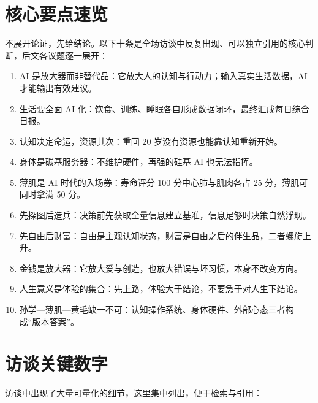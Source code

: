 \section{核心要点速览}

不展开论证，先给结论。以下十条是全场访谈中反复出现、可以独立引用的核心判断，后文各议题逐一展开：

\begin{enumerate}
\def\labelenumi{\arabic{enumi}.}
\tightlist
\item
  AI 是放大器而非替代品：它放大人的认知与行动力；输入真实生活数据，AI
  才能输出有效建议。
\item
  生活要全面 AI
  化：饮食、训练、睡眠各自形成数据闭环，最终汇成每日综合日报。
\item
  认知决定命运，资源其次：重回 20 岁没有资源也能靠认知重新开始。
\item
  身体是碳基服务器：不维护硬件，再强的硅基 AI 也无法指挥。
\item
  薄肌是 AI 时代的入场券：寿命评分 100 分中心肺与肌肉各占 25
  分，薄肌可同时拿满 50 分。
\item
  先探图后造兵：决策前先获取全量信息建立基准，信息足够时决策自然浮现。
\item
  先自由后财富：自由是主观认知状态，财富是自由之后的伴生品，二者螺旋上升。
\item
  金钱是放大器：它放大爱与创造，也放大错误与坏习惯，本身不改变方向。
\item
  人生意义是体验的集合：先上路，体验大于结论，不要急于对人生下结论。
\item
  孙学---薄肌---黄毛缺一不可：认知操作系统、身体硬件、外部心态三者构成``版本答案''。
\end{enumerate}

\section{访谈关键数字}

访谈中出现了大量可量化的细节，这里集中列出，便于检索与引用：

